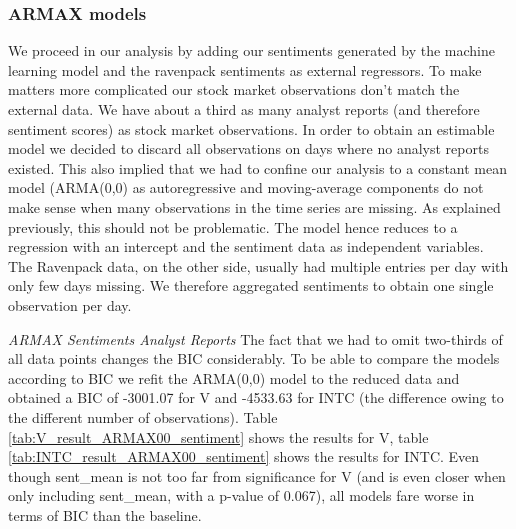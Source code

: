 \subsubsection{ARMAX models}
We proceed in our analysis by adding our sentiments generated by the machine learning model and the ravenpack sentiments as external regressors. To make matters more complicated our stock market observations don't match the external data. We have about a third as many analyst reports (and therefore sentiment scores) as stock market observations. In order to obtain an estimable model we decided to discard all observations on days where no analyst reports existed. This also implied that we had to confine our analysis to a constant mean model (ARMA(0,0) as autoregressive and moving-average components do not make sense when many observations in the time series are missing. As explained previously, this should not be problematic. The model hence reduces to a regression with an intercept and the sentiment data as independent variables. The Ravenpack data, on the other side, usually had multiple entries per day with only few days missing. We therefore aggregated sentiments to obtain one single observation per day. 

\textit{ARMAX Sentiments Analyst Reports}
The fact that we had to omit two-thirds of all data points changes the BIC considerably. To be able to compare the models according to BIC we refit the ARMA(0,0) model to the reduced data and obtained a BIC of -3001.07 for V and -4533.63 for INTC (the difference owing to the different number of observations). Table \ref{tab:V_result_ARMAX00_sentiment} shows the results for V, table \ref{tab:INTC_result_ARMAX00_sentiment} shows the results for INTC. Even though sent\_mean is not too far from significance for V (and is even closer when only including sent\_mean, with a p-value of 0.067), all models fare worse in terms of BIC than the baseline. 

\begin{table}[h]
    \centering
    
    \caption{}
    \label{tab:V_result_ARMAX00_sentiment}
\end{table}{}

\begin{table}[h!]
    \centering
    
    \caption{}
    \label{tab:INTC_result_ARMAX00_sentiment}
\end{table}{}

